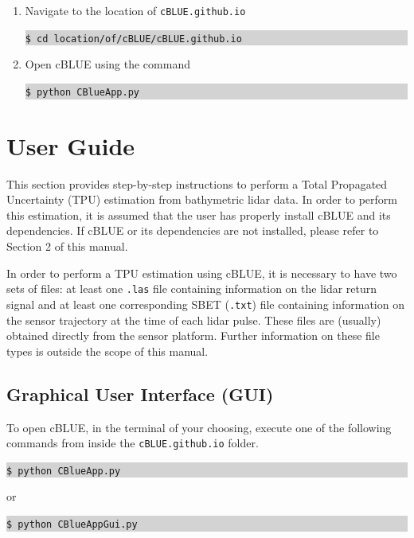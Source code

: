 \documentclass[11pt, a4paper]{article}
\begin{document}
\begin{enumerate}
\begin{figure}[H]
    \end{figure}
    \vspace{1em}
    \item Navigate to the location of \texttt{cBLUE.github.io}
    \colorbox{lightgray}{\begin{minipage}{\linewidth}
          \texttt{\$ cd location/of/cBLUE/cBLUE.github.io}
    \end{minipage}}
    \vspace{1em}
    \item Open cBLUE using the command
    \colorbox{lightgray}{\begin{minipage}{\linewidth}
        \texttt{\$ python CBlueApp.py}
    \end{minipage}}
\end{enumerate}

\section{User Guide}
This section provides step-by-step instructions to perform a Total Propagated Uncertainty (TPU) estimation from bathymetric lidar data. In order to perform this estimation, it is assumed that the user has properly install cBLUE and its dependencies. If cBLUE or its dependencies are not installed, please refer to Section 2 of this manual.

\vspace{1em}

In order to perform a TPU estimation using cBLUE, it is necessary to have two sets of files: at least one \texttt{.las} file containing information on the lidar return signal and at least one corresponding SBET (\texttt{.txt}) file containing information on the sensor trajectory at the time of each lidar pulse. These files are (usually) obtained directly from the sensor platform. Further information on these file types is outside the scope of this manual.

\vspace{1em}
\subsection{Graphical User Interface (GUI)}
To open cBLUE, in the terminal of your choosing, execute one of the following commands from inside the \texttt{cBLUE.github.io} folder.
\colorbox{lightgray}{\begin{minipage}{\linewidth}
        \texttt{\$ python CBlueApp.py}
\end{minipage}}
or
\colorbox{lightgray}{\begin{minipage}{\linewidth}
        \texttt{\$ python CBlueAppGui.py}
\end{minipage}}
\end{document}
